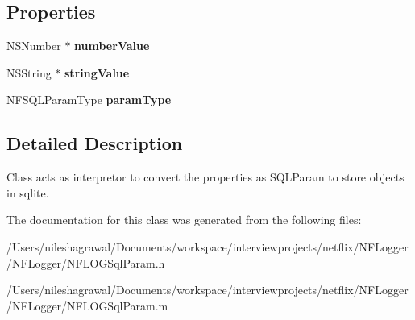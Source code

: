 \subsection*{Properties}
\begin{DoxyCompactItemize}
\item 
\mbox{\label{interface_n_f_l_o_g_sql_param_a2e606eacd2424b48821250bd29fcd108}} 
N\+S\+Number $\ast$ {\bfseries number\+Value}
\item 
\mbox{\label{interface_n_f_l_o_g_sql_param_a5764697810ad60f7810afbd799ecde73}} 
N\+S\+String $\ast$ {\bfseries string\+Value}
\item 
\mbox{\label{interface_n_f_l_o_g_sql_param_af0efe41a334a4f143da59126af14aade}} 
N\+F\+S\+Q\+L\+Param\+Type {\bfseries param\+Type}
\end{DoxyCompactItemize}


\subsection{Detailed Description}
Class acts as interpretor to convert the properties as S\+Q\+L\+Param to store objects in sqlite. 

The documentation for this class was generated from the following files\+:\begin{DoxyCompactItemize}
\item 
/\+Users/nileshagrawal/\+Documents/workspace/interviewprojects/netflix/\+N\+F\+Logger/\+N\+F\+Logger/N\+F\+L\+O\+G\+Sql\+Param.\+h\item 
/\+Users/nileshagrawal/\+Documents/workspace/interviewprojects/netflix/\+N\+F\+Logger/\+N\+F\+Logger/N\+F\+L\+O\+G\+Sql\+Param.\+m\end{DoxyCompactItemize}
